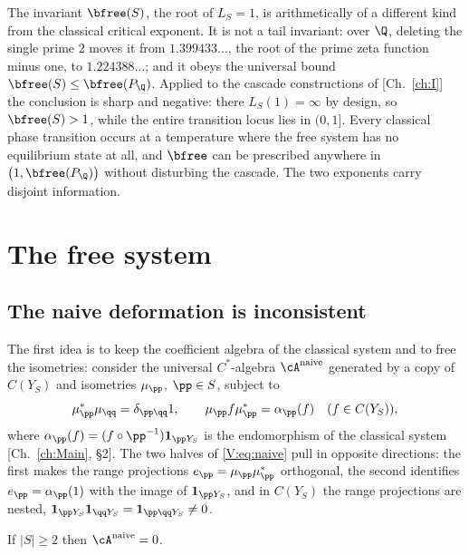 \begin{summary}
The invariant $\bfree(S)$, the root of $L_S=1$, is arithmetically of a different kind from
the classical critical exponent. It is not a tail invariant: over $\Q$, deleting the single
prime $2$ moves it from $1.399433\ldots$, the root of the prime zeta function minus one,
to $1.224388\ldots$; and it obeys the universal bound $\bfree(S)\le\bfree(P_\Q)$. Applied to
the cascade constructions of [Ch.~\ref{ch:I}] the conclusion is sharp and negative: there
$L_S(1)=\infty$ by design, so $\bfree(S)>1$, while the entire transition locus lies in
$(0,1]$. Every classical phase transition occurs at a temperature where the free system has no
equilibrium state at all, and $\bfree$ can be prescribed anywhere in $\bigl(1,\bfree(P_\Q)\bigr)$
without disturbing the cascade. The two exponents carry disjoint information.
\end{summary}

\section{The free system}

\subsection{The naive deformation is inconsistent}

The first idea is to keep the coefficient algebra of the classical system and to free the
isometries: consider the universal $C^*$-algebra $\cA^{\mathrm{naive}}$ generated by a copy
of $C(Y_S)$ and isometries $\mu_\pp$, $\pp\in S$, subject to
\begin{equation}\label{V:eq:naive}
\mu_\pp^*\mu_\qq=\delta_{\pp\qq}1,\qquad \mu_\pp f\mu_\pp^*=\alpha_\pp(f)\quad(f\in C(Y_S)),
\end{equation}
where $\alpha_\pp(f)=(f\circ\pp^{-1})\mathbf 1_{\pp Y_S}$ is the endomorphism of the
classical system [Ch.~\ref{ch:Main}, \S2]. The two halves of \eqref{V:eq:naive} pull in opposite
directions: the first makes the range projections $e_\pp=\mu_\pp\mu_\pp^*$ orthogonal, the
second identifies $e_\pp=\alpha_\pp(1)$ with the image of $\mathbf 1_{\pp Y_S}$, and in
$C(Y_S)$ the range projections are nested, $\mathbf 1_{\pp Y_S}\mathbf 1_{\qq Y_S}=\mathbf 1_{\pp\qq Y_S}\ne0$.

\begin{proposition}[Incompatibility]\label{V:prop:naive}
If $|S|\ge2$ then $\cA^{\mathrm{naive}}=0$.
\end{proposition}

